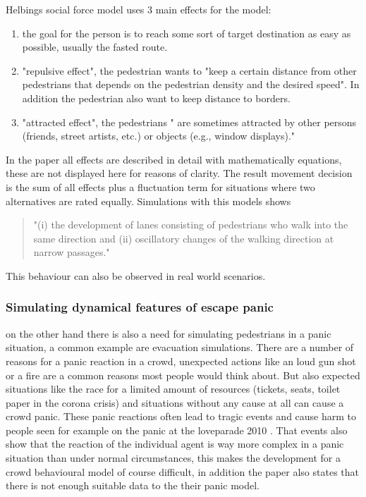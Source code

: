 \documentclass[sigconf]{acmart}
\begin{document}
Helbings social force model uses 3 main effects for the model:
\begin{enumerate}
    \item the goal for the person is to reach some sort of target destination as easy as possible, usually the fasted route.
    \item "repulsive effect", the pedestrian wants to "keep a certain distance from other pedestrians that depends on the pedestrian density and the desired speed". In addition the pedestrian also want to keep distance to borders.  
    \item "attracted effect", the pedestrians " are sometimes attracted by other persons (friends, street artists, etc.) or objects (e.g., window displays)."
\end{enumerate}
In the paper all effects are described in detail with mathematically equations, these are not displayed here for reasons of clarity. The result movement decision is the sum of all effects plus a fluctuation term for situations where two alternatives are rated equally. Simulations with this models shows 
\begin{quote}
    "(i) the development of lanes consisting of pedestrians who walk into the same direction and (ii) oscillatory changes of the walking direction at narrow passages."
\end{quote}
This behaviour can also be observed in real world scenarios. 

\subsubsection{Simulating dynamical features of escape panic}\cite{helbing_simulating_2000} on the other hand there is also a need for simulating pedestrians in a panic situation, a common example are evacuation simulations.
There are a number of reasons for a panic reaction in a crowd, unexpected actions like an loud gun shot or a fire are a common reasons most people would think about. But also expected situations like the race for a limited amount of resources (tickets, seats, toilet paper in the corona crisis)  and situations without any cause at all can cause a crowd panic. These panic reactions often lead to tragic events and cause harm to people seen for example on the panic at the loveparade 2010 \cite{dumbs_massenpanik_2010} . That events also show that the reaction of the individual agent is way more complex in a panic situation than under normal circumstances, this makes the development for a crowd behavioural model of course difficult, in addition the paper also states that there is not enough suitable data to the their panic model. 
\end{document}
